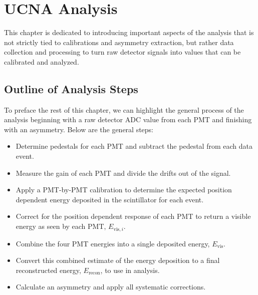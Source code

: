\chapter{UCNA Analysis}
\label{ch:UCNA_Analysis}

This chapter is dedicated to introducing important aspects of the analysis that
is not strictly tied to calibrations and asymmetry extraction, but rather
data collection and processing to turn raw detector signals into values that
can be calibrated and analyzed. 






\section{Outline of Analysis Steps}

To preface the rest of this chapter, we can highlight
the general process of the analysis beginning with a raw detector
ADC value from each PMT and finishing with an asymmetry.
Below are the general steps:

\begin{itemize}
\item Determine pedestals for each PMT and subtract the pedestal from each data event.
\item Measure the gain of each PMT and divide the drifts out of the signal.
\item Apply a PMT-by-PMT calibration to determine the expected position dependent
  energy deposited in the scintillator
  for each event.
\item Correct for the position dependent response of each PMT
  to return a visible energy as seen by each PMT, $E_{\mathrm{vis},i}$.
\item Combine the four PMT energies into a single deposited energy, $E_{\mathrm{vis}}$.
\item Convert this combined estimate of the energy deposition to a final
  reconstructed energy, $E_{\mathrm{recon}}$, to use in analysis.
\item Calculate an asymmetry and apply all systematic corrections.
\end{itemize}

